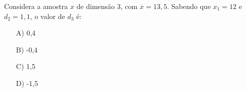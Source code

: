 Considera a amostra $x$ de dimensão 3, com $\overline{x} = 13,5$. Sabendo que $x_1=12$ e $d_2=1,1$, o valor de $d_3$ é:
\begin{enumerate}
\item [A)] 0,4
\item [B)] -0,4
\item [C)] 1,5
\item [D)] -1,5
\end{enumerate}
